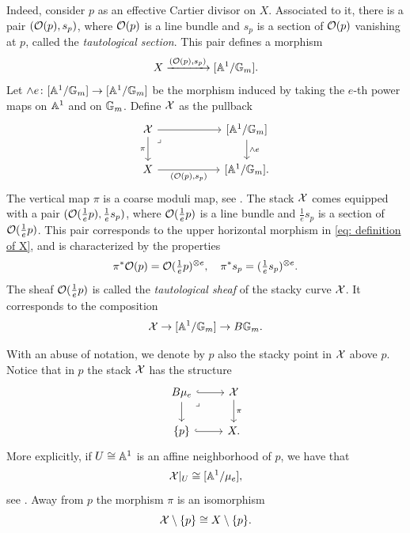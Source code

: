 Indeed, consider $p$ as an effective Cartier divisor on $X$. Associated to it, there is a pair $(\mathcal{O}(p), s_p)$, where $\mathcal{O}(p)$ is a line bundle and $s_p$ is a section of $\mathcal{O}(p)$ vanishing at $p$, called the \textit{tautological section}. This pair defines a morphism
\[
X \xrightarrow{(\mathcal{O}(p), s_p)} [\mathbb{A}^1/\mathbb{G}_m].
\]
Let $\wedge e \colon [\mathbb{A}^1/\mathbb{G}_m] \to [\mathbb{A}^1/\mathbb{G}_m]$ be the morphism induced by taking the $e$-th power maps on $\mathbb{A}^1$ and on $\mathbb{G}_m$. Define $\mathcal{X}$ as the pullback
\begin{equation} \label{eq: definition of X}
\begin{tikzcd}
	\Xc && {[\Ab^1/\Gb_m]} \\
	X & {} & {[\Ab^1/\Gb_m].}
	\arrow[from=1-1, to=1-3]
	\arrow["\pi"', from=1-1, to=2-1]
	\arrow["\lrcorner"{anchor=center, pos=0.125}, draw=none, from=1-1, to=2-2]
	\arrow["{\wedge e}", from=1-3, to=2-3]
	\arrow["{(\O(p), s_p)}"', from=2-1, to=2-3]
\end{tikzcd}
\end{equation}
The vertical map $\pi$ is a coarse moduli map, see \cite[Corollary 2.3.7]{Cadman}.
The stack $\mathcal{X}$ comes equipped with a pair $(\mathcal{O}(\frac{1}{e}p), \frac{1}{e}s_p)$, where $\mathcal{O}(\frac{1}{e}p)$ is a line bundle and $\frac{1}{e}s_p$ is a section of $\mathcal{O}(\tfrac{1}{e}p)$. This pair corresponds to the upper horizontal morphism in \eqref{eq: definition of X}, and is characterized by the properties
\[
\pi^*\mathcal{O}(p) = \mathcal{O}(\tfrac{1}{e}p)^{\otimes e}, \quad \pi^* s_p = (\tfrac{1}{e}s_p)^{\otimes e}.
\]
The sheaf $\mathcal{O}(\frac{1}{e}p)$ is called the \textit{tautological sheaf} of the stacky curve $\mathcal{X}$. It corresponds to the composition
\[
\mathcal{X} \to [\mathbb{A}^1 / \mathbb{G}_m] \to B\mathbb{G}_m.
\]

With an abuse of notation, we denote by $p$ also the stacky point in $\mathcal{X}$ above $p$. Notice that in $p$ the stack $\mathcal{X}$ has the structure
\begin{equation}\label{punctual structure X}
\begin{tikzcd}
	{B\mu_e} & \Xc \\
	{\{p\}} & X.
	\arrow[hook, from=1-1, to=1-2]
	\arrow[from=1-1, to=2-1]
	\arrow["\lrcorner"{anchor=center, pos=0.125}, draw=none, from=1-1, to=2-2]
	\arrow["\pi", from=1-2, to=2-2]
	\arrow[hook, from=2-1, to=2-2]
\end{tikzcd}
\end{equation}
More explicitly, if $U \cong \mathbb{A}^1$ is an affine neighborhood of $p$, we have that
\begin{equation}\label{X|U}
\mathcal{X}\vert_U \cong [\mathbb{A}^1/\mu_e],
\end{equation}
see \cite[Lemma 2.3.1]{Cadman}.
Away from $p$ the morphism $\pi$ is an isomorphism
\begin{equation}\label{X-p}
\mathcal{X} \setminus \{ p \} \cong X \setminus \{p\}.
\end{equation}

